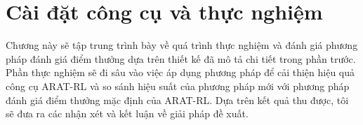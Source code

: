 \chapter{Cài đặt công cụ và thực nghiệm}
\label{chap:experiment}

Chương này sẽ tập trung trình bày về quá trình thực nghiệm và đánh giá phương pháp đánh giá điểm thưởng dựa trên thiết kế đã mô tả chi tiết trong phần trước. Phần thực nghiệm sẽ đi sâu vào việc áp dụng phương pháp để cải thiện hiệu quả công cụ ARAT-RL và so sánh hiệu suất của phương pháp mới với phương pháp đánh giá điểm thưởng mặc định của ARAT-RL. Dựa trên kết quả thu được, tôi sẽ đưa ra các nhận xét và kết luận về giải pháp đề xuất.


